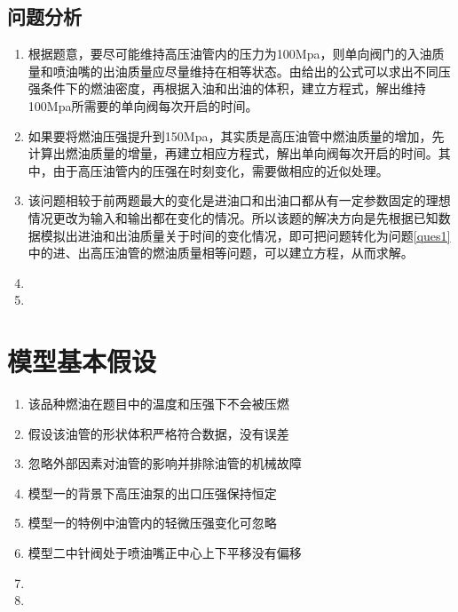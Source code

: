 \documentclass{cumcmthesis}
\begin{document}
\subsection{问题分析}
\begin{enumerate}[label=\Roman*.]
	\item 根据题意，要尽可能维持高压油管内的压力为100Mpa，则单向阀门的入油质量和喷油嘴的出油质量应尽量维持在相等状态。由给出的公式可以求出不同压强条件下的燃油密度，再根据入油和出油的体积，建立方程式，解出维持100Mpa所需要的单向阀每次开启的时间。
	\item 如果要将燃油压强提升到150Mpa，其实质是高压油管中燃油质量的增加，先计算出燃油质量的增量，再建立相应方程式，解出单向阀每次开启的时间。其中，由于高压油管内的压强在时刻变化，需要做相应的近似处理。
	\item 该问题相较于前两题最大的变化是进油口和出油口都从有一定参数固定的理想情况更改为输入和输出都在变化的情况。所以该题的解决方向是先根据已知数据模拟出进油和出油质量关于时间的变化情况，即可把问题转化为问题\ref{ques1}中的进、出高压油管的燃油质量相等问题，可以建立方程，从而求解。
	\item
	\item
\end{enumerate}
\section{模型基本假设}
\begin{enumerate}
	\item 该品种燃油在题目中的温度和压强下不会被压燃
	\item 假设该油管的形状体积严格符合数据，没有误差
	\item 忽略外部因素对油管的影响并排除油管的机械故障
	\item 模型一的背景下高压油泵的出口压强保持恒定
	\item 模型一的特例中油管内的轻微压强变化可忽略
	\item 模型二中针阀处于喷油嘴正中心上下平移没有偏移
	\item 
	\item
\end{enumerate}
\end{document}
